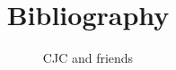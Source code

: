 \documentclass{article}
\begin{document}
\title{Bibliography}
\author{CJC and friends}
\maketitle
\nocite{*}

\end{document}
